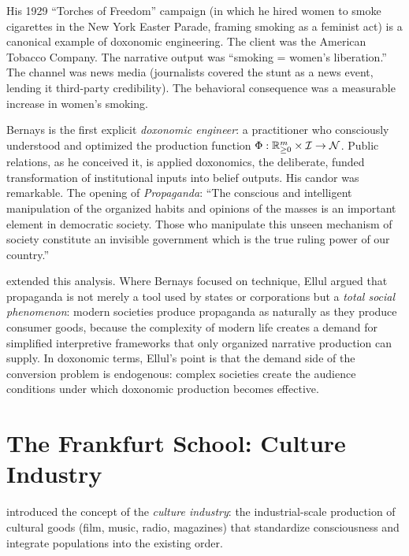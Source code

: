 His 1929 ``Torches of Freedom'' campaign (in which he hired women to smoke cigarettes in the New York Easter Parade, framing smoking as a feminist act) is a canonical example of doxonomic engineering.
The client was the American Tobacco Company.
The narrative output was ``smoking = women's liberation.''
The channel was news media (journalists covered the stunt as a news event, lending it third-party credibility).
The behavioral consequence was a measurable increase in women's smoking.

\begin{remark}
Bernays is the first explicit \emph{doxonomic engineer}: a practitioner who consciously understood and optimized the production function $\Phi: \mathbb{R}^m_{\geq 0} \times \mathcal{I} \to \mathcal{N}$.
Public relations, as he conceived it, is applied doxonomics, the deliberate, funded transformation of institutional inputs into belief outputs.
His candor was remarkable.
The opening of \textit{Propaganda}: ``The conscious and intelligent manipulation of the organized habits and opinions of the masses is an important element in democratic society.
Those who manipulate this unseen mechanism of society constitute an invisible government which is the true ruling power of our country.''
\end{remark}

\textcite{ellul1965} extended this analysis.
Where Bernays focused on technique, Ellul argued that propaganda is not merely a tool used by states or corporations but a \emph{total social phenomenon}: modern societies produce propaganda as naturally as they produce consumer goods, because the complexity of modern life creates a demand for simplified interpretive frameworks that only organized narrative production can supply.
In doxonomic terms, Ellul's point is that the demand side of the conversion problem is endogenous: complex societies create the audience conditions under which doxonomic production becomes effective.


\section{The Frankfurt School: Culture Industry}
\label{sec:ch3-frankfurt}

\textcite{adorno1944} introduced the concept of the \emph{culture industry}: the industrial-scale production of cultural goods (film, music, radio, magazines) that standardize consciousness and integrate populations into the existing order.

